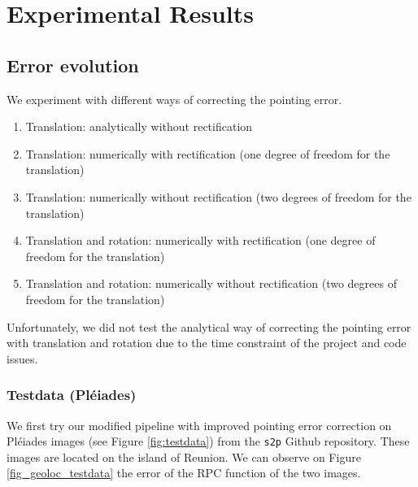 \documentclass[paper=a4, fontsize=11pt, onecolumn, tikz, dvipsnames, svgnames, x11names]{article}
\begin{document}
\newpage
\section{Experimental Results}

 \subsection{Error evolution}

 We experiment with different ways of correcting the pointing error.
 \begin{enumerate}
 \item Translation: analytically without rectification
 \item Translation: numerically with rectification (one degree of freedom for the translation)
  \item Translation: numerically without rectification (two degrees of freedom for the translation)
   \item Translation and rotation: numerically with rectification (one degree of freedom for the translation)
    \item Translation and rotation: numerically without rectification (two degrees of freedom for the translation)
 \end{enumerate}
Unfortunately, we did not test the analytical way of correcting the pointing error with translation and rotation due to the time constraint of the project and code issues.

 \subsubsection{Testdata (Pléiades)}
 We first try our modified pipeline with improved pointing error correction on Pléiades images (see Figure \ref{fig:testdata}) from the \verb|s2p| Github repository. These images are located on the island of Reunion. We can observe on Figure \ref{fig_geoloc_testdata} the error of the RPC function of the two images.\\
\end{document}
